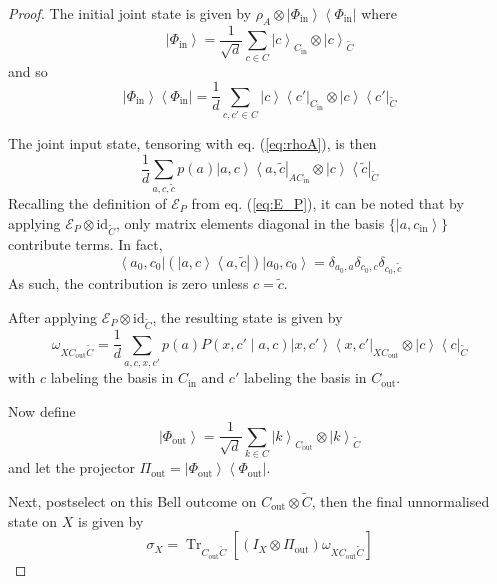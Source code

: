 \documentclass[10pt, a4paper]{article}
\newcommand{\bra}[1]{\left\langle{#1}\right|}
\newcommand{\ket}[1]{\left|{#1}\right\rangle}
\newcommand{\Tr}[0]{\operatorname{Tr}}
\newcommand{\id}[0]{\mathrm{id}}
\begin{document}
\begin{proof}
    The initial joint state is given by $\rho_A \otimes \ket{\Phi_{\mathrm{in}}}\bra{
    \Phi_{\mathrm{in}}}$ where $$ \ket{\Phi_{\mathrm{in}}} = \frac{1}{\sqrt{d}} \sum_{c \in C} \ket{c}_{C_{\mathrm{in}}} \otimes \ket{c}_{\widetilde{C}} $$ and so $$ \ket{\Phi_{\mathrm{in}}}\bra{\Phi_{\mathrm{in}}} = \frac{1}{d} \sum_{c, c' \in C} \ket{c}\bra{c'}_{C_{\mathrm{in}}} \otimes \ket{c}\bra{c'}_{\widetilde{C}} $$ 
    
    The joint input state, tensoring with eq. (\ref{eq:rhoA}), is then $$ \frac{1}{d} \sum_{a,c,\tilde{c}} p(a) \ket{a,c}\bra{a,\tilde{c}}_{A C_{\mathrm{in}}} \otimes \ket{c}\bra{\tilde{c}}_{\widetilde C} $$ Recalling the definition of $\mathcal{E}_P$ from eq. (\ref{eq:E_P}), it can be noted that by applying $\mathcal{E}_P \otimes \id_{\widetilde{C}} $, only matrix elements diagonal in the basis $ \{\ket{a, c_{\mathrm{in}}}\}$ contribute terms. In fact, $$ \bra{a_0, c_0} (\ket{a, c} \bra{a, \tilde{c}} ) \ket{a_0, c_0} = \delta_{a_0, a} \delta_{c_0, c} \delta_{c_0, \tilde{c}} $$ As such, the contribution is zero unless $c = \tilde{c}$. 

    After applying $\mathcal{E}_P \otimes \id_{\widetilde{C}} $, the resulting state is given by $$ \omega_{X C_{\mathrm{out}}\widetilde C} = \frac{1}{d} \sum_{a,c,x,c'} p(a) P(x,c'\mid a,c) \ket{x,c'} \bra{x, c'}_{X C_{\mathrm{out}}} \otimes \ket{c}\bra{c}_{\widetilde C} $$ with $c$ labeling the basis in $C_{\mathrm{in}}$ and $c'$ labeling the basis in $C_{\mathrm{out}}$.

    Now define $$ \ket{\Phi_{\mathrm{out}}} = \frac{1}{\sqrt{d}} \sum_{k \in C} \ket{k}_{C_{\mathrm{out}}} \otimes \ket{k}_{\widetilde{C}} $$ and let the projector $\Pi_{\mathrm{out}} = \ket{\Phi_{\mathrm{out}}} \bra{\Phi_{\mathrm{out}}}$.

    Next, postselect on this Bell outcome on $C_{\mathrm{out}} \otimes \widetilde{C}$, then the final unnormalised state on $X$ is given by
    \begin{equation}\label{eq:sigmaXQuantum}
        \sigma_X = \Tr_{C_{\mathrm{out}}\widetilde{C}} [(I_X \otimes \Pi_{\mathrm{out}}) \omega_{X C_{\mathrm{out}} \widetilde{C}}]
    \end{equation}


\end{proof}
\end{document}
